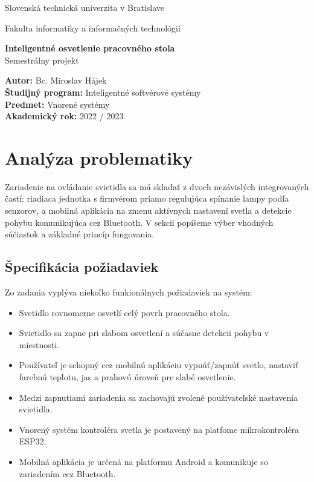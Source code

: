 \documentclass[12pt, a4paper]{article}
\begin{document}
\begin{titlepage}
{\centering
    {\Large Slovenská technická univerzita v Bratislave}\par
    {\Large Fakulta informatiky a informačných technológií}\par
    \vspace{\medskipamount}
    \vfill
    \LARGE \textbf{Inteligentné osvetlenie pracovného stola} \\
    \vspace{0.7\bigskipamount}
    {\Large Semestrálny projekt}\par
    \vfill
}
\normalsize    
\begin{flushleft}
\textbf{Autor:} Bc. Miroslav Hájek \\
\textbf{Študijný program:} Inteligentné softvérové systémy \\
\textbf{Predmet:} Vnorené systémy \\
\textbf{Akademický rok:} 2022 / 2023 \\
\end{flushleft}
\end{titlepage}

\thispagestyle{empty}


\tableofcontents
\newpage

\setcounter{page}{1}

\section{Analýza problematiky}
Zariadenie na ovládanie svietidla sa má skladať z dvoch nezávislých integrovaných častí: riadiaca jednotka s firmvérom priamo regulujúca spínanie lampy podľa senzorov, a mobilná aplikácia na zmenu aktívnych nastavení svetla a detekcie pohybu komunikujúca cez Bluetooth. V sekcii popíšeme výber vhodných súčiastok a základné princíp fungovania.

\subsection{Špecifikácia požiadaviek}
Zo zadania vyplýva niekoľko funkionálnych požiadaviek na systém:
\begin{itemize}
\itemsep0pt
\item Svetidlo rovnomerne osvetlí celý povrh pracovného stola.
\item Svietidlo sa zapne pri slabom osvetlení a súčasne detekcii pohybu v miestnosti.
\item Používateľ je schopný cez mobilnú aplikáciu vypnúť/zapnúť svetlo, nastaviť farebnú teplotu, jas a prahovú úroveň pre slabé osvetlenie.
\item Medzi zapnutiami zariadenia sa zachovajú zvolené používateľské nastavenia svietidla. 
\item Vnorený systém kontroléra svetla je postavený na platfome mikrokontroléra ESP32.
\item Mobilná aplikácia je určená na platformu Android a komunikuje so zariadením cez Bluetooth.
\end{itemize}
\end{document}
